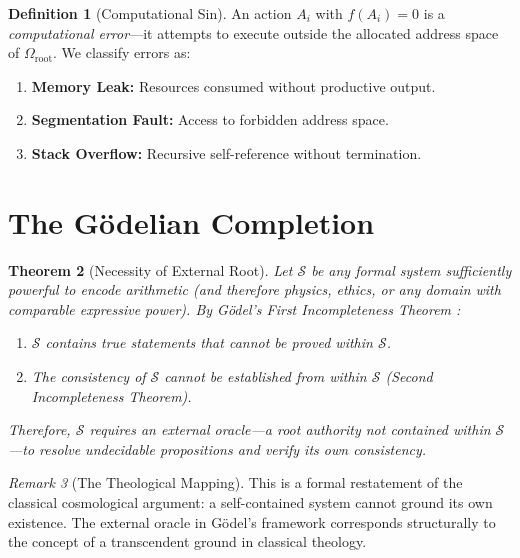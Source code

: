 \documentclass[12pt, a4paper]{article}
\theoremstyle{plain}
\newtheorem{theorem}{Theorem}[section]
\theoremstyle{definition}
\newtheorem{definition}[theorem]{Definition}
\theoremstyle{remark}
\newtheorem{remark}[theorem]{Remark}
\begin{document}
\begin{definition}[Computational Sin]\label{def:sin}
  An action $A_i$ with $f(A_i) = 0$ is a \emph{computational error}---it
  attempts to execute outside the allocated address space of
  $\Omega_{\text{root}}$. We classify errors as:
  \begin{enumerate}[label=(\roman*)]
    \item \textbf{Memory Leak:} Resources consumed without productive output.
    \item \textbf{Segmentation Fault:} Access to forbidden address space.
    \item \textbf{Stack Overflow:} Recursive self-reference without termination.
  \end{enumerate}
\end{definition}

\section{The G\"odelian Completion}\label{sec:godelian}

\begin{theorem}[Necessity of External Root]\label{thm:godelian}
  Let $\mathcal{S}$ be any formal system sufficiently powerful to encode
  arithmetic (and therefore physics, ethics, or any domain with comparable
  expressive power). By G\"odel's First Incompleteness Theorem
  \citep{Godel1931}:
  \begin{enumerate}[label=(\alph*)]
    \item $\mathcal{S}$ contains true statements that cannot be proved
      within $\mathcal{S}$.
    \item The consistency of $\mathcal{S}$ cannot be established from
      within $\mathcal{S}$ (Second Incompleteness Theorem).
  \end{enumerate}
  Therefore, $\mathcal{S}$ requires an \emph{external oracle}---a root
  authority not contained within $\mathcal{S}$---to resolve undecidable
  propositions and verify its own consistency.
\end{theorem}

\begin{remark}[The Theological Mapping]
  This is a formal restatement of the classical cosmological argument:
  a self-contained system cannot ground its own existence. The external
  oracle in G\"odel's framework corresponds structurally to the concept
  of a transcendent ground in classical theology.
\end{remark}
\end{document}
